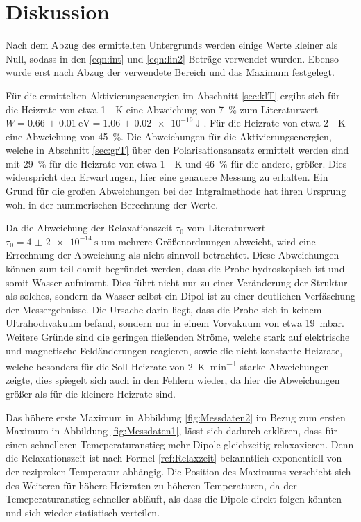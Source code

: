 \section{Diskussion}
\label{sec:Diskussion}
Nach dem Abzug des ermittelten Untergrunds werden einige Werte kleiner als Null, sodass in den \eqref{eqn:int} und \eqref{eqn:lin2} Beträge
verwendet wurden. Ebenso wurde erst nach Abzug der verwendete Bereich und das Maximum festgelegt.

Für die ermittelten Aktivierungsenergien im Abschnitt \ref{sec:klT} ergibt sich für die Heizrate von etwa \SI{1}{\per\kelvin} eine 
Abweichung von \SI{7}{\percent} zum Literaturwert $W=\SI{0.66(1)}{\electronvolt} = \SI{1.06(2)e-19}{\joule}$ \cite{quelle}.
Für die Heizrate von  etwa \SI{2}{\per\kelvin} eine Abweichung von \SI{45}{\percent}. 
Die Abweichungen für die Aktivierungsenergien, welche in Abschnitt \ref{sec:grT} über den Polarisationsansatz ermittelt werden sind mit
\SI{29}{\percent} für die Heizrate von etwa \SI{1}{\per\kelvin} und \SI{46}{\percent} für die andere, größer. Dies 
widerspricht den Erwartungen, hier eine genauere Messung zu erhalten. Ein Grund für die großen Abweichungen
bei der Intgralmethode hat ihren Ursprung wohl in der nummerischen Berechnung der Werte.

Da die Abweichung der Relaxationszeit $\tau_0$ vom Literaturwert $\tau_0 = \SI{4(2)e-14}{\second}$ um mehrere Größenordnungen
abweicht, wird eine Errechnung der Abweichung als nicht sinnvoll betrachtet.
Diese Abweichungen können zum teil damit begründet werden, dass die Probe hydroskopisch ist 
und somit Wasser aufnimmt. Dies führt nicht nur zu einer Veränderung der Struktur als solches, sondern da Wasser selbst ein 
Dipol ist zu einer deutlichen Verfäschung der Messergebnisse. Die Ursache darin liegt, dass die Probe sich in keinem 
Ultrahochvakuum befand, sondern nur in einem Vorvakuum von etwa \SI{19}{\milli\bar}. 
Weitere Gründe sind die geringen fließenden Ströme, welche stark auf elektrische und magnetische Feldänderungen reagieren, sowie
die nicht konstante Heizrate, welche besonders für die Soll-Heizrate von \SI{2}{\kelvin\per\minute} starke Abweichungen zeigte, dies 
spiegelt sich auch in den Fehlern wieder, da hier die Abweichungen größer als für die kleinere Heizrate sind.


Das höhere erste Maximum in Abbildung \ref{fig:Messdaten2} im Bezug zum ersten Maximum in Abbildung \ref{fig:Messdaten1}, lässt
sich dadurch erklären, dass für einen schnelleren Temeperaturanstieg mehr Dipole gleichzeitig relaxaxieren. Denn die Relaxationszeit
ist nach Formel \eqref{ref:Relaxzeit} bekanntlich exponentiell von der reziproken Temperatur abhängig.
Die Position des Maximums verschiebt sich des Weiteren für höhere Heizraten zu höheren Temperaturen, da der Temeperaturanstieg
schneller abläuft, als dass die Dipole direkt folgen könnten und sich wieder statistisch verteilen.

